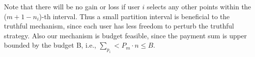 \documentclass[conference]{IEEEtran}
\theoremstyle{definition}
\begin{document}
{\color{black}Note that there will be no gain or loss if user $i$ selects any other points within the ($m+1-n_i$)-th interval. Thus a small partition interval is beneficial to the truthful mechanism, since each user has less freedom to perturb the truthful strategy. }
{\color{blue}Also our mechanism is budget feasible, since the payment sum is upper bounded by the budget B, i.e., $\sum_{p_i} < P_m\cdot n \leq B$.}

\end{document}

